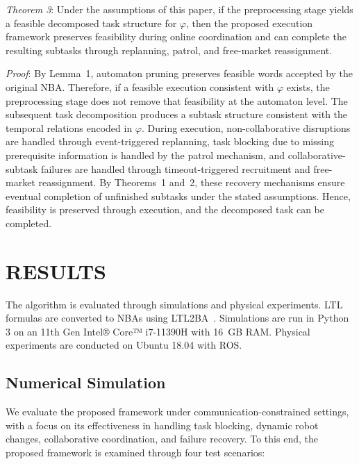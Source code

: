 \documentclass[lettersize,journal]{IEEEtran}
\begin{document}
\textit{Theorem 3}: Under the assumptions of this paper, if the preprocessing stage yields a feasible decomposed task structure for $\varphi$, then the proposed execution framework preserves feasibility during online coordination and can complete the resulting subtasks through replanning, patrol, and free-market reassignment.

\textit{Proof}: By Lemma~1, automaton pruning preserves feasible words accepted by the original NBA. Therefore, if a feasible execution consistent with $\varphi$ exists, the preprocessing stage does not remove that feasibility at the automaton level. The subsequent task decomposition produces a subtask structure consistent with the temporal relations encoded in $\varphi$. During execution, non-collaborative disruptions are handled through event-triggered replanning, task blocking due to missing prerequisite information is handled by the patrol mechanism, and collaborative-subtask failures are handled through timeout-triggered recruitment and free-market reassignment. By Theorems~1 and~2, these recovery mechanisms ensure eventual completion of unfinished subtasks under the stated assumptions. Hence, feasibility is preserved through execution, and the decomposed task can be completed.

\section{RESULTS} \label{result}
The algorithm is evaluated through simulations and physical experiments. LTL formulas are converted to NBAs using LTL2BA~\cite{10.1007/3-540-44585-4_6}. Simulations are run in Python 3 on an 11th Gen Intel® Core™ i7-11390H with 16~GB RAM. Physical experiments are conducted on Ubuntu 18.04 with ROS.

\subsection{Numerical Simulation}

We evaluate the proposed framework under communication-constrained settings, with a focus on its effectiveness in handling task blocking, dynamic robot changes, collaborative coordination, and failure recovery. To this end, the proposed framework is examined through four test scenarios:
\end{document}

